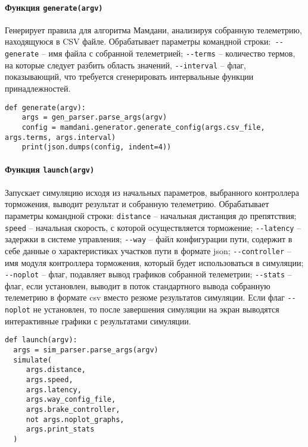 \paragraph{Функция \lstinline!generate(argv)!}

 Генерирует правила для алгоритма Мамдани, анализируя собранную телеметрию, находящуюся в CSV файле. Обрабатывает параметры командной строки:\lstinline! --generate! – имя файла с собранной телеметрией; \lstinline!--terms! –  количество термов, на которые следует разбить область значений, \lstinline!--interval! – флаг, показывающий, что требуется сгенерировать интервальные функции принадлежностей.

\begin{lstlisting}[style=pythonstyle,caption={ }, label=lst:func:1]
  def generate(argv):
    args = gen_parser.parse_args(argv)
    config = mamdani.generator.generate_config(args.csv_file, args.terms, args.interval)
    print(json.dumps(config, indent=4))
\end{lstlisting}

\paragraph{Функция \lstinline!launch(argv)!}

Запускает симуляцию исходя из начальных параметров, выбранного контроллера торможения, выводит результат и собранную телеметрию. Обрабатывает параметры командной строки: \lstinline!distance! – начальная дистанция до препятствия; \lstinline!speed! – начальная скорость, с которой осуществляется торможение; \lstinline!--latency! – задержки в системе управления; \lstinline!--way! – файл конфигурации пути, содержит в себе данные о характеристиках участков пути в формате json; \lstinline!--controller! – имя модуля контроллера торможения, который будет использоваться в симуляции; \lstinline!--noplot! – флаг, подавляет вывод графиков собранной телеметрии; \lstinline!--stats! – флаг, если установлен, выводит в поток стандартного вывода собранную телеметрию в формате csv вместо резюме результатов  симуляции. Если флаг \lstinline!--noplot! не установлен, то после завершения симуляции на экран выводятся интерактивные графики с результатами симуляции.

\begin{lstlisting}[style=pythonstyle,caption={}, label=lst:func:1]
def launch(argv):
  args = sim_parser.parse_args(argv)
  simulate(
     args.distance,
     args.speed,
     args.latency,
     args.way_config_file,
     args.brake_controller,
     not args.noplot_graphs,
     args.print_stats
  )
\end{lstlisting}

